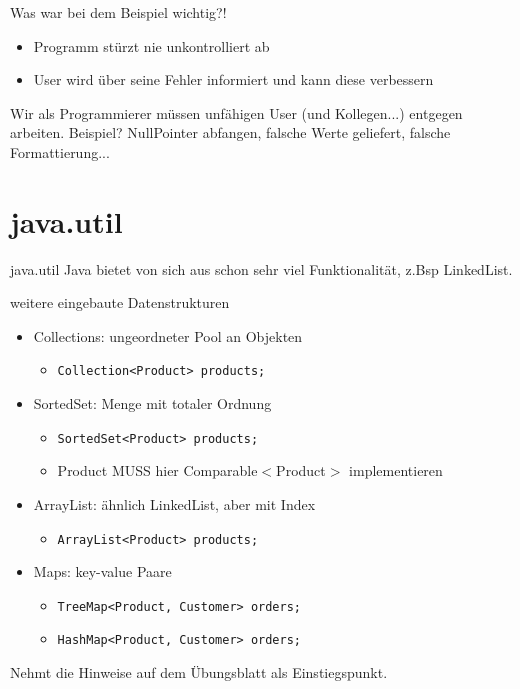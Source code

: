 \documentclass[18pt]{beamer}
\begin{document}
\begin{frame}{Was war bei dem Beispiel wichtig?!}
\pause
\begin{itemize}
	\item Programm stürzt nie unkontrolliert ab \pause
	\item User wird über seine Fehler informiert und kann diese verbessern  \pause
\end{itemize} \pause
Wir als Programmierer müssen unfähigen User (und Kollegen...) entgegen arbeiten. \newline  
Beispiel?  \pause NullPointer abfangen, falsche Werte geliefert, falsche Formattierung...

\end{frame}

\section{java.util}
\begin{frame}[fragile]{java.util}
Java bietet von sich aus schon sehr viel Funktionalität, z.Bsp LinkedList. \pause
\begin{example}{weitere eingebaute Datenstrukturen} \pause
\begin{itemize}
	\item Collections: ungeordneter Pool an Objekten 
	\begin{itemize}
		\item \lstinline{Collection<Product> products;} \pause
	\end{itemize}
	\item SortedSet: Menge mit totaler Ordnung
	\begin{itemize}
		\item \lstinline{SortedSet<Product> products;} \pause
		\item Product MUSS hier Comparable$<$Product$>$ implementieren \pause
	\end{itemize}
	\item ArrayList: ähnlich LinkedList, aber mit Index
	\begin{itemize}
		\item \lstinline{ArrayList<Product> products;} \pause
	\end{itemize}
	\item Maps: key-value Paare 
	\begin{itemize}
		\item \lstinline{TreeMap<Product, Customer> orders;}
		\item \lstinline{HashMap<Product, Customer> orders;}
	\end{itemize}
\end{itemize}
\end{example}
Nehmt die Hinweise auf dem Übungsblatt als Einstiegspunkt.
\end{frame}
\end{document}
